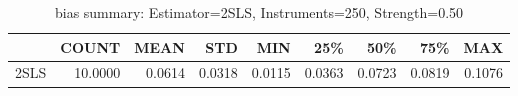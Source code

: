 \begin{table}[ht]
\centering
\caption{bias summary: Estimator=2SLS, Instruments=250, Strength=0.50}
\begin{tabular}{lrrrrrrrr}
\toprule
 & COUNT & MEAN & STD & MIN & 25\% & 50\% & 75\% & MAX \\
\midrule
2SLS & 10.0000 & 0.0614 & 0.0318 & 0.0115 & 0.0363 & 0.0723 & 0.0819 & 0.1076 \\
\bottomrule
\end{tabular}
\end{table}

